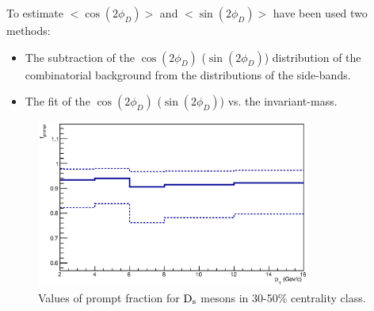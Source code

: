 To estimate $< \cos(2\phi_D) >$ and $< \sin(2\phi_D) >$ 
have been used two methods:
\begin{itemize}
\item The subtraction of the $\cos(2\phi_D)$ ($\sin(2\phi_D)$) 
distribution of the combinatorial background from the distributions of the side-bands.
\item The fit of the $\cos(2\phi_D)$ ($\sin(2\phi_D)$) vs. the invariant-mass.
\end{itemize}
\fi
\begin{figure}
 \centering
 \includegraphics[width=9cm]{FigCap5/fprompt_3050.eps}
\caption{Values of prompt fraction for ${\rm D_s}$ mesons in 30-50\% centrality class.}
\label{fig:fPrompt}
\end{figure}

